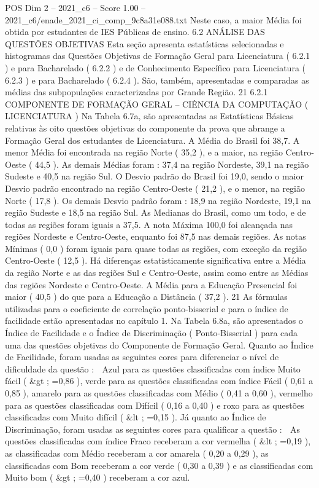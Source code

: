 \begin{textsample}{POS Dim 2 – 2021\_c6 – Score 1.00 – 2021\_c6/enade\_2021\_ci\_comp\_9c8a31e088.txt}
Neste caso, a maior Média foi obtida por estudantes de IES Públicas de ensino. 6.2 ANÁLISE DAS QUESTÕES OBJETIVAS Esta seção apresenta estatísticas selecionadas e histogramas das Questões Objetivas de Formação Geral para Licenciatura ( 6.2.1 ) e para Bacharelado ( 6.2.2 ) e de Conhecimento Específico para Licenciatura ( 6.2.3 ) e para Bacharelado ( 6.2.4 ).
São, também, apresentadas e comparadas as médias das subpopulações caracterizadas por Grande Região. 21 6.2.1 COMPONENTE DE FORMAÇÃO GERAL – CIÊNCIA DA COMPUTAÇÃO ( LICENCIATURA ) Na Tabela 6.7a, são apresentadas as Estatísticas Básicas relativas às oito questões objetivas do componente da prova que abrange a Formação Geral dos estudantes de Licenciatura.
A Média do Brasil foi 38,7.
A menor Média foi encontrada na região Norte ( 35,2 ), e a maior, na região Centro-Oeste ( 44,5 ).
As demais Médias foram : 37,4 na região Nordeste, 39,1 na região Sudeste e 40,5 na região Sul.
O Desvio padrão do Brasil foi 19,0, sendo o maior Desvio padrão encontrado na região Centro-Oeste ( 21,2 ), e o menor, na região Norte ( 17,8 ).
Os demais Desvio padrão foram : 18,9 na região Nordeste, 19,1 na região Sudeste e 18,5 na região Sul.
As Medianas do Brasil, como um todo, e de todas as regiões foram iguais a 37,5.
A nota Máxima 100,0 foi alcançada nas regiões Nordeste e Centro-Oeste, enquanto foi 87,5 nas demais regiões.
As notas Mínimas ( 0,0 ) foram iguais para quase todas as regiões, com exceção da região Centro-Oeste ( 12,5 ).
Há diferenças estatisticamente significativa entre a Média da região Norte e as das regiões Sul e Centro-Oeste, assim como entre as Médias das regiões Nordeste e Centro-Oeste.
A Média para a Educação Presencial foi maior ( 40,5 ) do que para a Educação a Distância ( 37,2 ). 21 As fórmulas utilizadas para o coeficiente de correlação ponto-bisserial e para o índice de facilidade estão apresentadas no capítulo 1.
Na Tabela 6.8a, são apresentados o Índice de Facilidade e o Índice de Discriminação ( Ponto-Bisserial ) para cada uma das questões objetivas do Componente de Formação Geral.
Quanto ao Índice de Facilidade, foram usadas as seguintes cores para diferenciar o nível de dificuldade da questão :  Azul para as questões classificadas com índice Muito fácil ( \&gt ; =0,86 ), verde para as questões classificadas com índice Fácil ( 0,61 a 0,85 ), amarelo para as questões classificadas com Médio ( 0,41 a 0,60 ), vermelho para as questões classificadas com Difícil ( 0,16 a 0,40 ) e roxo para as questões classificadas com Muito difícil ( \&lt ; =0,15 ).
Já quanto ao Índice de Discriminação, foram usadas as seguintes cores para qualificar a questão :  As questões classificadas com índice Fraco receberam a cor vermelha ( \&lt ; =0,19 ), as classificadas com Médio receberam a cor amarela ( 0,20 a 0,29 ), as classificadas com Bom receberam a cor verde ( 0,30 a 0,39 ) e as classificadas com Muito bom ( \&gt ; =0,40 ) receberam a cor azul.

\end{textsample}
